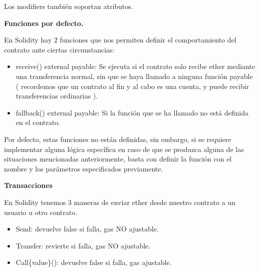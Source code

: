 Los modifiers también soportan atributos.

\bigskip



\newpage

\bigskip

\textbf{Funciones por defecto.}

\bigskip

En Solidity hay 2 funciones que nos permiten definir el comportamiento del contrato ante ciertas circunstancias:

\begin{itemize}
    \item receive() external payable: Se ejecuta si el contrato solo recibe ether mediante una transferencia normal, sin que se haya llamado a ninguna función payable ( recordemos que un contrato al fin y al cabo es una cuenta, y puede recibir transferencias ordinarias ).

    \item fallback() external payable: Si la función que se ha llamado no está definida en el contrato.
\end{itemize}

\bigskip

Por defecto, estas funciones no están definidas, sin embargo, si se requiere implementar alguna lógica específica en caso de que se produzca alguna de las situaciones mencionadas anteriormente, basta con definir la función con el nombre y los parámetros especificados previamente.

\bigskip



\newpage

\bigskip

\textbf{Transacciones}

\bigskip

En Solidity tenemos 3 maneras de enviar ether desde nuestro contrato a un usuario u otro contrato.

\begin{itemize}
    \item Send: devuelve false si falla, gas NO ajustable.
    \item Transfer: revierte si falla, gas NO ajustable.
    \item Call\{value\}(\quotes{}): devuelve false si falla, gas ajustable.
\end{itemize}

